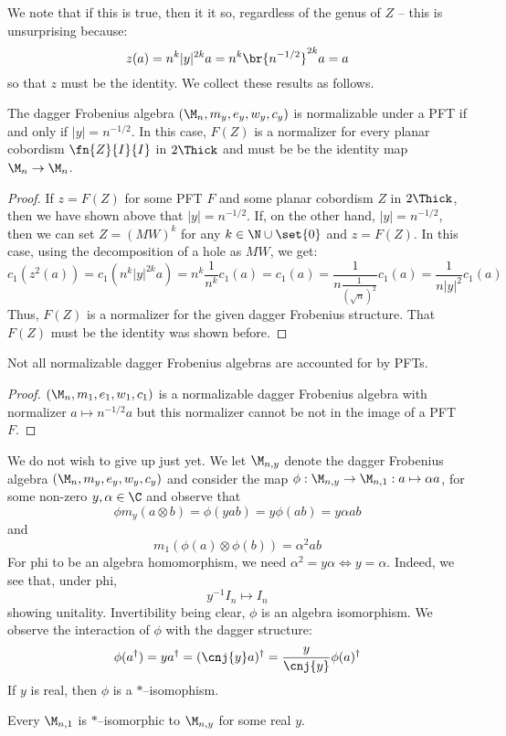 We note that if this is true, then it it so, regardless of the genus of $Z$ --
this is unsurprising because:
\[
  z(a) = n^k|y|^{2k} a = n^k \br{n^{-1/2}}^{2k} a = a
\]
so that $z$ must be the identity. We collect these results as follows.
\begin{thm}\label{pftnorm}
The dagger Frobenius algebra $(\M_n, m_y, e_y, w_y, c_y)$ is normalizable under
a PFT if and only if $|y| = n^{-1/2}$. In this case, $F(Z)$ is a normalizer for
every planar cobordism $\fn{Z}{I}{I}$ in $2\Thick$ and must be be the identity
map $\M_n \to \M_n$.
\end{thm}
\begin{proof}
If $z = F(Z)$ for some PFT $F$ and some planar cobordism $Z$ in $2\Thick$, then
we have shown above that $|y| = n^{-1/2}$. If, on the other hand,
$|y| = n^{-1/2}$, then we can set $Z = (MW)^k$ for any $k \in \N \cup \set{0}$
and $z = F(Z)$. In this case, using the decomposition of a hole as $MW$, we
get:
\[
  c_1(z^2(a)) = c_1(n^k|y|^{2k} a) = n^k \frac{1}{n^k} c_1(a) = c_1(a)
    = \frac{1}{n \frac{1}{(\sqrt{n})^2}} c_1(a)
    = \frac{1}{n|y|^2} c_1(a)
\]
Thus, $F(Z)$ is a normalizer for the given dagger Frobenius structure. That
$F(Z)$ must be the identity was shown before.
\end{proof}

\begin{cor}
Not all normalizable dagger Frobenius algebras are accounted for by PFTs.
\end{cor}
\begin{proof}
$(\M_n, m_1, e_1, w_1, c_1)$ is a normalizable dagger Frobenius algebra with
normalizer $a \mapsto n^{-1/2} a$ but this normalizer cannot be not in the
image of a PFT $F$.
\end{proof}

We do not wish to give up just yet. We let $\M_{n, y}$ denote the dagger
Frobenius algebra $(\M_n, m_y, e_y, w_y, c_y)$ and consider the map
$\phi : \M_{n, y} \to \M_{n, 1} : a \mapsto \alpha a$, for some non-zero
$y, \alpha \in \C$ and observe that
\[
  \phi m_y(a \otimes b) = \phi(yab) = y\phi(ab) = y\alpha ab
\]
and
\[
  m_1(\phi(a) \otimes \phi(b)) = \alpha^2 ab
\]
For phi to be an algebra homomorphism, we need $\alpha^2 = y\alpha \iff y =
\alpha$. Indeed, we see that, under phi,
\[
  y^{-1}I_n \mapsto I_n
\]
showing unitality. Invertibility being clear, $\phi$ is an algebra isomorphism.
We observe the interaction of $\phi$ with the dagger structure:
\[
  \phi(a^{\dagger}) = ya^{\dagger} = (\cnj{y}a)^{\dagger} =
    \frac{y}{\cnj{y}}\phi(a)^{\dagger}
\]
If $y$ is real, then $\phi$ is a $*$--isomophism.
\begin{thm}
Every $\M_{n, 1}$ is $*$--isomorphic to $\M_{n, y}$ for some real $y$.
\end{thm}

